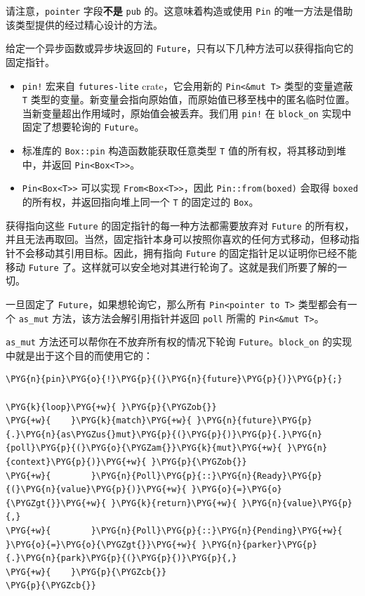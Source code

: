 请注意，\texttt{pointer} 字段\textbf{不是} \texttt{pub} 的。这意味着构造或使用 \texttt{Pin} 的唯一方法是借助该类型提供的经过精心设计的方法。

给定一个异步函数或异步块返回的 \texttt{Future}，只有以下几种方法可以获得指向它的固定指针。

\begin{itemize}
\item \texttt{pin!} 宏来自 \texttt{futures-lite} crate，它会用新的 \texttt{Pin<\&mut T>} 类型的变量遮蔽 \texttt{T} 类型的变量。新变量会指向原始值，而原始值已移至栈中的匿名临时位置。当新变量超出作用域时，原始值会被丢弃。我们用 \texttt{pin!} 在 \texttt{block\_on} 实现中固定了想要轮询的 \texttt{Future}。
\item 标准库的 \texttt{Box::pin} 构造函数能获取任意类型 \texttt{T} 值的所有权，将其移动到堆中，并返回 \texttt{Pin<Box<T>>}。
\item \texttt{Pin<Box<T>>} 可以实现 \texttt{From<Box<T>>}，因此 \texttt{Pin::from(boxed)} 会取得 \texttt{boxed} 的所有权，并返回指向堆上同一个 \texttt{T} 的固定过的 \texttt{Box}。
\end{itemize}

获得指向这些 \texttt{Future} 的固定指针的每一种方法都需要放弃对 \texttt{Future} 的所有权，并且无法再取回。当然，固定指针本身可以按照你喜欢的任何方式移动，但移动指针不会移动其引用目标。因此，拥有指向 \texttt{Future} 的固定指针足以证明你已经不能移动 \texttt{Future} 了。这样就可以安全地对其进行轮询了。这就是我们所要了解的一切。

一旦固定了 \texttt{Future}，如果想轮询它，那么所有 \texttt{Pin<pointer to T>} 类型都会有一个 \texttt{as\_mut} 方法，该方法会解引用指针并返回 \texttt{poll} 所需的 \texttt{Pin<\&mut T>}。

\texttt{as\_mut} 方法还可以帮你在不放弃所有权的情况下轮询 \texttt{Future}。\texttt{block\_on} 的实现中就是出于这个目的而使用它的：

\begin{Verbatim}[commandchars=\\\{\},breaklines=true,breakanywhere=true,fontsize=\codefont,xleftmargin=17bp]
\PYG{n}{pin}\PYG{o}{!}\PYG{p}{(}\PYG{n}{future}\PYG{p}{)}\PYG{p}{;}

\PYG{k}{loop}\PYG{+w}{ }\PYG{p}{\PYGZob{}}
\PYG{+w}{    }\PYG{k}{match}\PYG{+w}{ }\PYG{n}{future}\PYG{p}{.}\PYG{n}{as\PYGZus{}mut}\PYG{p}{(}\PYG{p}{)}\PYG{p}{.}\PYG{n}{poll}\PYG{p}{(}\PYG{o}{\PYGZam{}}\PYG{k}{mut}\PYG{+w}{ }\PYG{n}{context}\PYG{p}{)}\PYG{+w}{ }\PYG{p}{\PYGZob{}}
\PYG{+w}{        }\PYG{n}{Poll}\PYG{p}{::}\PYG{n}{Ready}\PYG{p}{(}\PYG{n}{value}\PYG{p}{)}\PYG{+w}{ }\PYG{o}{=}\PYG{o}{\PYGZgt{}}\PYG{+w}{ }\PYG{k}{return}\PYG{+w}{ }\PYG{n}{value}\PYG{p}{,}
\PYG{+w}{        }\PYG{n}{Poll}\PYG{p}{::}\PYG{n}{Pending}\PYG{+w}{ }\PYG{o}{=}\PYG{o}{\PYGZgt{}}\PYG{+w}{ }\PYG{n}{parker}\PYG{p}{.}\PYG{n}{park}\PYG{p}{(}\PYG{p}{)}\PYG{p}{,}
\PYG{+w}{    }\PYG{p}{\PYGZcb{}}
\PYG{p}{\PYGZcb{}}
\end{Verbatim}


